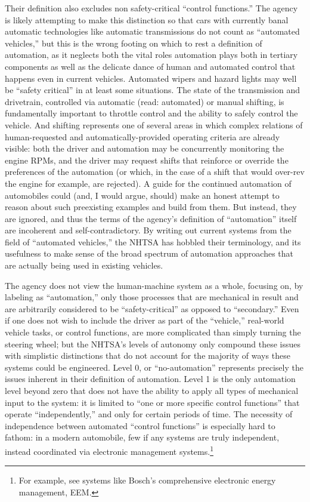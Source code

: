 Their definition also excludes non safety-critical ``control
functions.'' The agency is likely attempting to make this distinction
so that cars with currently banal automatic technologies like
automatic transmissions do 
not count as ``automated vehicles,'' but this is the wrong footing on
which to rest a definition of automation, as it neglects both the
vital roles automation plays both in tertiary components as well as
the delicate dance of human and automated control that happens even in
current vehicles. Automated wipers and hazard
lights may well be ``safety critical'' in at least some situations.
The state of the transmission 
and drivetrain, controlled via automatic (read: automated) or manual
shifting, is fundamentally important to throttle control and the
ability to safely control the vehicle. And shifting represents one of
several areas
in which complex relations of human-requested and
automatically-provided operating criteria are already visible: both
the driver and automation may be concurrently monitoring the engine
RPMs, and the driver may request shifts that reinforce or override the
preferences of the automation (or which, in the case of a shift that would
over-rev the engine for example, are rejected). A guide for the
continued automation of automobiles could (and, I would argue, should)
make an honest attempt to reason about such preexisting examples and
build from them. But instead, they are ignored, and thus the
terms of the agency's definition of ``automation'' itself are incoherent
and self-contradictory. By writing out current systems from the field
of ``automated vehicles,'' the NHTSA has hobbled their terminology,
and its usefulness to make sense of the broad spectrum of automation
approaches that are actually being used in existing vehicles.

The agency does not view the human-machine system as a whole, focusing
on, by labeling as ``automation,'' only those processes that are
mechanical in result and are arbitrarily considered to be
``safety-critical'' as opposed to ``secondary.'' Even if one does not
wish to include 
the driver as part of the ``vehicle,'' real-world vehicle tasks, or
control functions, are more complicated than simply turning the
steering wheel; but the NHTSA's levels of autonomy only compound these
issues with simplistic distinctions that do not account for the
majority of ways these systems could be engineered. Level 0, or
``no-automation'' represents 
precisely the issues inherent in their definition of automation. Level
1 is the only automation level beyond zero that does not have the
ability to apply all types of mechanical input to the system: it is
limited to ``one or more specific control functions'' that operate
``independently,'' and only for certain periods of time.\cite[p. 4]{NHTSA} The
necessity of independence between automated ``control functions'' is
especially hard to fathom: in a modern automobile, few if any systems
are truly independent, instead coordinated via electronic management
systems.\footnote{For example, see systems like Bosch's comprehensive
  electronic energy management, EEM.} 

